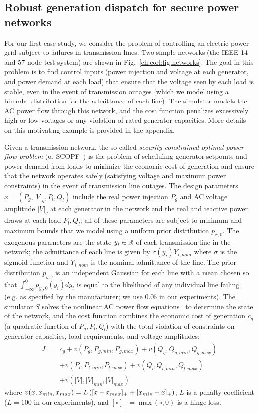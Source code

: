 \subsection{Robust generation dispatch for secure power networks}

For our first case study, we consider the problem of controlling an electric power grid subject to failures in transmission lines. Two simple networks (the IEEE 14- and 57-node test system) are shown in Fig.~\ref{ch:corl:fig:networks}. The goal in this problem is to find control inputs (power injection and voltage at each generator, and power demand at each load) that ensure that the voltage seen by each load is stable, even in the event of transmission outages (which we model using a bimodal distribution for the admittance of each line). The simulator models the AC power flow through this network, and the cost function penalizes excessively high or low voltages or any violation of rated generator capacities. More details on this motivating example is provided in the appendix.

Given a transmission network, the so-called \textit{security-constrained optimal power flow problem} (or SCOPF~\cite{capitanescuStateoftheartChallengesFuture2011}) is the problem of scheduling generator setpoints and power demand from loads to minimize the economic cost of generation and ensure that the network operates safely (satisfying voltage and maximum power constraints) in the event of transmission line outages. The design parameters $x = (P_g, |V|_g, P_l, Q_l)$ include the real power injection $P_g$ and AC voltage amplitude $|V|_g$ at each generator in the network and the real and reactive power draws at each load $P_l, Q_l$; all of these parameters are subject to minimum and maximum bounds that we model using a uniform prior distribution $p_{x, 0}$. The exogenous parameters are the state $y_i \in \mathbb{R}$ of each transmission line in the network; the admittance of each line is given by $\sigma(y_i) Y_{i, nom}$ where $\sigma$ is the sigmoid function and $Y_{i, nom}$ is the nominal admittance of the line. The prior distribution $p_{y, 0}$ is an independent Gaussian for each line with a mean chosen so that $\int_{-\infty}^0 p_{y_i, 0}(y_i) dy_i$ is equal to the likelihood of any individual line failing (e.g. as specified by the manufacturer; we use $0.05$ in our experiments). The simulator $S$ solves the nonlinear AC power flow equations~\cite{cainHistoryOptimalPower2012} to determine the state of the network, and the cost function combines the economic cost of generation $c_g$ (a quadratic function of $P_g, P_l, Q_l$) with the total violation of constraints on generator capacities, load requirements, and voltage amplitudes:
\begin{align}
    J = & c_g + v(P_g, P_{g, min}, P_{g, max}) + v(Q_g, Q_{g, min}, Q_{g, max}) \\
        & + v(P_l, P_{l, min}, P_{l, max}) + v(Q_l, Q_{l, min}, Q_{l, max})     \\
        & + v(|V|, |V|_{min}, |V|_{max}) \label{ch:corl:eq:scopf_cost}
\end{align}
where $v(x, x_{min}, x_{max}) = L\left( [x - x_{max}]_+ + [x_{min} - x]_+ \right)$, $L$ is a penalty coefficient ($L=100$ in our experiments), and $[\circ]_+ = \max(\circ, 0)$ is a hinge loss.

